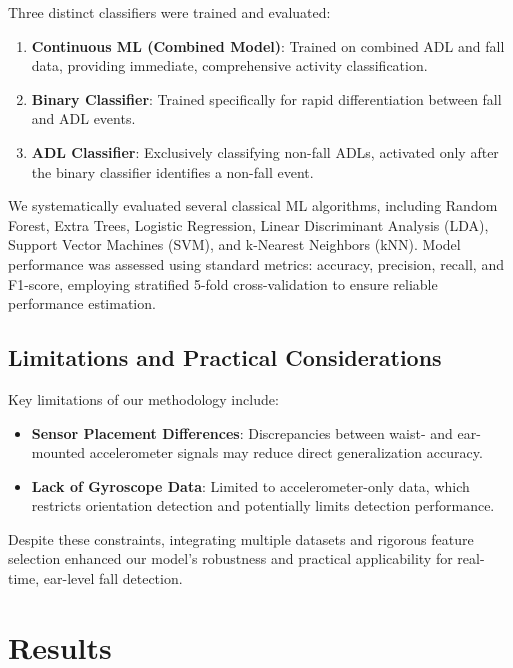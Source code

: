 \documentclass[conference]{IEEEtran}
\begin{document}
Three distinct classifiers were trained and evaluated:
\begin{enumerate}
\item \textbf{Continuous ML (Combined Model)}: Trained on combined ADL and fall data, providing immediate, comprehensive activity classification.
\item \textbf{Binary Classifier}: Trained specifically for rapid differentiation between fall and ADL events.
\item \textbf{ADL Classifier}: Exclusively classifying non-fall ADLs, activated only after the binary classifier identifies a non-fall event.
\end{enumerate}
\vspace{1em}

We systematically evaluated several classical ML algorithms, including Random Forest, Extra Trees, Logistic Regression, Linear Discriminant Analysis (LDA), Support Vector Machines (SVM), and k-Nearest Neighbors (kNN). Model performance was assessed using standard metrics: accuracy, precision, recall, and F1-score, employing stratified 5-fold cross-validation to ensure reliable performance estimation.

\subsection{Limitations and Practical Considerations}

Key limitations of our methodology include:
\begin{itemize}
\item \textbf{Sensor Placement Differences}: Discrepancies between waist- and ear-mounted accelerometer signals may reduce direct generalization accuracy.
\item \textbf{Lack of Gyroscope Data}: Limited to accelerometer-only data, which restricts orientation detection and potentially limits detection performance.
\end{itemize}

Despite these constraints, integrating multiple datasets and rigorous feature selection enhanced our model's robustness and practical applicability for real-time, ear-level fall detection.


\vspace{1em}
\section{Results}
\end{document}
